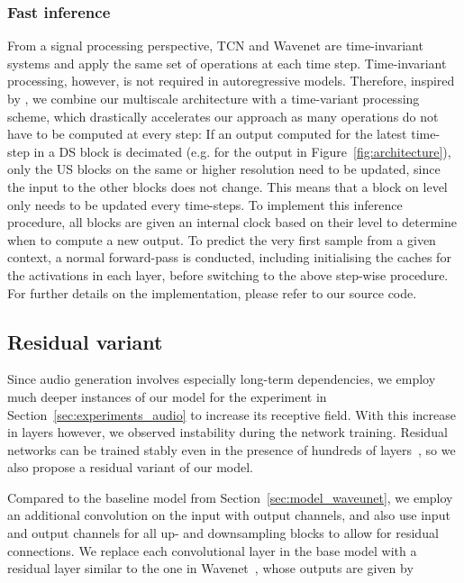 \documentclass{article}
\begin{document}
\subsubsection{Fast inference}
\label{sec:method_inference}

From a signal processing perspective, TCN and Wavenet are time-invariant systems and apply the same set of operations at each time step. Time-invariant processing, however, is not required in autoregressive models. Therefore, inspired by \cite{koutnikClockworkRNN2014}, we combine our multiscale architecture with a time-variant processing scheme, which drastically accelerates our approach as many operations do not have to be computed at every step:
If an output computed for the latest time-step in a DS block is decimated (e.g. for the output  in Figure~\ref{fig:architecture}), only the US blocks on the same or higher resolution need to be updated, since the input to the other blocks does not change.
This means that a block on level  only needs to be updated every  time-steps.
To implement this inference procedure, all blocks are given an internal clock based on their level to determine when to compute a new output.
To predict the very first sample from a given context, a normal forward-pass is conducted, including initialising the caches for the activations in each layer, before switching to the above step-wise procedure. 
For further details on the implementation, please refer to our source code.

\subsection{Residual variant}
\label{sec:model_residual}

Since audio generation involves especially long-term dependencies, we employ much deeper instances of our model for the experiment in Section~\ref{sec:experiments_audio} to increase its receptive field.
With this increase in layers however, we observed instability during the network training.
Residual networks can be trained stably even in the presence of hundreds of layers~\cite{heDeepResidual2015}, so we also propose a residual variant of our model.

Compared to the baseline model from Section~\ref{sec:model_waveunet}, we employ an additional convolution on the input with  output channels, and also use  input and output channels for all up- and downsampling blocks to allow for residual connections.
We replace each convolutional layer in the base model with a residual layer similar to the one in Wavenet~\cite{dielemanWaveNetGenerative2016}, whose outputs  are given by
\end{document}

